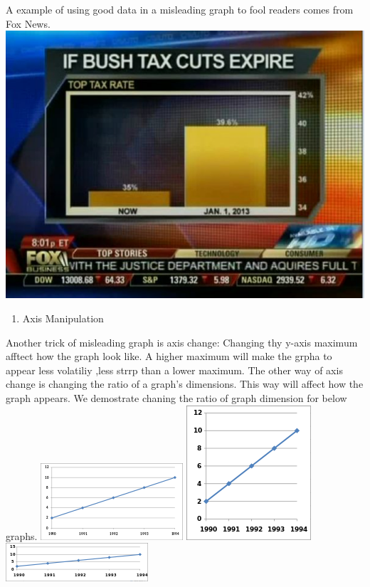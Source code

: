 \documentclass[]{book}
\providecommand{\tightlist}{%
  \setlength{\itemsep}{0pt}\setlength{\parskip}{0pt}}
\theoremstyle{definition}
\theoremstyle{definition}
\theoremstyle{definition}
\theoremstyle{remark}
\begin{document}
A example of using good data in a misleading graph to fool readers comes
from Fox News. \includegraphics{images/1.png}

\begin{enumerate}
\def\labelenumi{\arabic{enumi}.}
\setcounter{enumi}{1}
\tightlist
\item
  Axis Manipulation
\end{enumerate}

Another trick of misleading graph is axis change: Changing thy y-axis
maximum afftect how the graph look like. A higher maximum will make the
grpha to appear less volatiliy ,less strrp than a lower maximum. The
other way of axis change is changing the ratio of a graph's dimensions.
This way will affect how the graph appears. We demostrate chaning the
ratio of graph dimension for below graphs.
\includegraphics{images/Line_graph1.svg.png}
\includegraphics{images/175px-Line_graph1-3.svg.png}
\includegraphics{images/200px-Line_graph1-4.svg.png}
\end{document}
